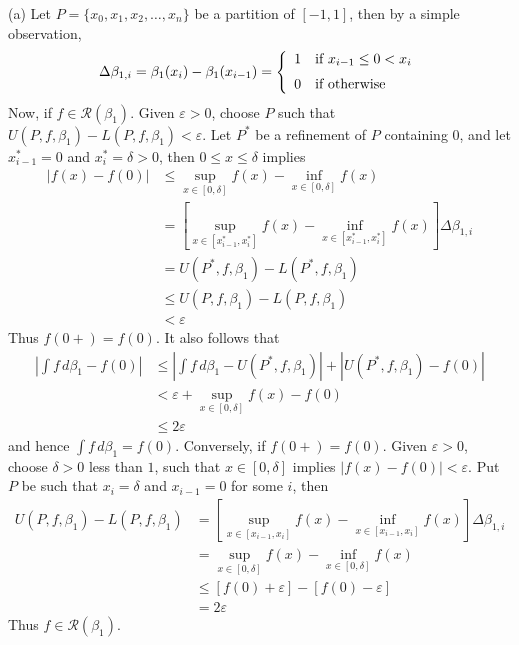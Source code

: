 \documentclass[12pt]{article}
\theoremstyle{definition}
\begin{document}
(a) Let $P=\{x_0,x_1,x_2,\ldots,x_n\}$ be a partition of $[-1,1]$, then by a simple observation,
\begin{align*}
\Delta\beta_{1,i}
=\beta_1(x_i)-\beta_1(x_{i-1})
=\left\{\begin{array}{ll}
1& \mbox{if }x_{i-1}\le 0<x_i\vspace{0.08in}\\
0& \mbox{if otherwise}
\end{array}\right.
\end{align*}
Now, if $f\in\mathcal{R}(\beta_1)$. Given $\varepsilon>0$, choose $P$ such that $U(P,f,\beta_1)-L(P,f,\beta_1)<\varepsilon$. Let $P^\ast$ be a refinement of $P$ containing $0$, and let $x^\ast_{i-1}=0$ and $x^\ast_i=\delta>0$, then $0\le x\le \delta$ implies
\begin{align*}
\left\vert f(x)-f(0)\right\vert
&\le\sup_{x\in[0,\delta]} f(x)-\inf_{x\in[0,\delta]} f(x)\\
&=\left[\sup_{x\in[x_{i-1}^\ast,x_i^\ast]} f(x)-\inf_{x\in[x_{i-1}^\ast,x_i^\ast]} f(x)\right]\Delta\beta_{1,i}\\
&=U(P^\ast,f,\beta_1)-L(P^\ast,f,\beta_1)\\
&\le U(P,f,\beta_1)-L(P,f,\beta_1)\\
&<\varepsilon
\end{align*}
Thus $f(0+)=f(0)$. It also follows that
\begin{align*}
\left\vert \int f\,d\beta_1-f(0)\right\vert
&\le\left\vert \int f\,d\beta_1-U(P^\ast,f,\beta_1)\right\vert+\left\vert U(P^\ast,f,\beta_1)-f(0)\right\vert \\
&<\varepsilon+\sup_{x\in[0,\delta]} f(x)-f(0) \\
&\le2\varepsilon
\end{align*}
and hence $\int f\,d\beta_1=f(0)$. Conversely, if $f(0+)=f(0)$. Given $\varepsilon>0$, choose $\delta>0$ less than $1$, such that $x\in[0,\delta]$ implies $\left\vert f(x)-f(0)\right\vert<\varepsilon$. Put $P$ be such that $x_i=\delta$ and $x_{i-1}=0$ for some $i$, then
\begin{align*}
U(P,f,\beta_1)-L(P,f,\beta_1)
&=\left[\sup_{x\in[x_{i-1},x_i]} f(x)-\inf_{x\in[x_{i-1},x_i]} f(x)\right]\Delta\beta_{1,i}\\
&=\sup_{x\in[0,\delta]} f(x)-\inf_{x\in[0,\delta]} f(x)\\
&\le \left[f(0)+\varepsilon\right]-\left[f(0)-\varepsilon\right]\\
&=2\varepsilon
\end{align*}
Thus $f\in\mathcal{R}(\beta_1)$.
\end{document}
